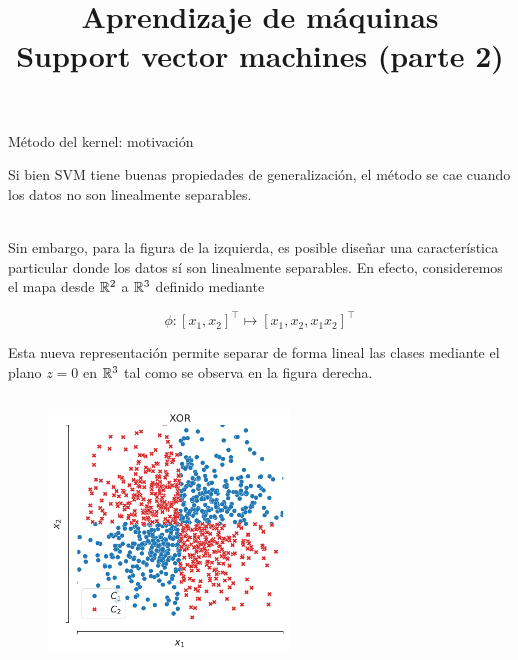 \documentclass[9pt]{beamer}
\title{\textbf{Aprendizaje de máquinas} \\ Support vector machines (parte 2)}
\begin{document}
\begin{frame}
  \titlepage
\end{frame}

\begin{frame}{Método del kernel: motivación}

Si bien SVM tiene buenas propiedades de generalización, el método se cae cuando los datos no son linealmente separables. \\~\ \pause

Sin embargo, para la figura de la izquierda, es posible diseñar una característica particular donde los datos sí son linealmente separables. En efecto, consideremos el mapa desde  $\mathbb{R}^2$ a $\mathbb{R}^3$ definido mediante

\begin{equation*}
	\phi: [x_1, x_2]^\top \mapsto [x_1, x_2, x_1 x_2]^\top
\end{equation*}

Esta nueva representación permite separar de forma lineal las clases mediante el plano $z=0$ en $\mathbb{R}^3$ tal como se observa en la figura derecha.

\begin{columns}
\begin{column}{0.5\textwidth}
\begin{figure}[ht]
    \centering
    \includegraphics[width=0.6\textwidth]{../img/cap5_xor}
\end{figure}	
\end{column}

\begin{column}{0.5\textwidth}
	

\end{column}
\end{columns}
\end{frame}
\end{document}
